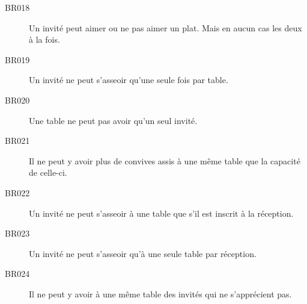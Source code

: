 \begin{description}
  \item[BR018]  Un invité peut aimer ou ne pas aimer un plat. Mais en aucun cas les deux à la fois.
  \item[BR019]  Un invité ne peut s'asseoir qu'une seule fois par table.
  \item[BR020]  Une table ne peut pas avoir qu'un seul invité.
  \item[BR021]  Il ne peut y avoir plus de convives assis à une même table que la capacité de celle-ci.
  \item[BR022]  Un invité ne peut s'asseoir à une table que s'il est inscrit à la réception.
  \item[BR023]  Un invité ne peut s'asseoir qu'à une seule table par réception.
  \item[BR024]  Il ne peut y avoir à une même table des invités qui ne s'apprécient pas.
\end{description}
